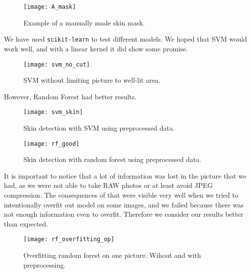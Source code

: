                 \begin{figure}[H]
                    \caption{Example of a manually made skin mask.}
                    \centering
                    \texttt{[image: A\_mask]}
                    \label{fig:A_mask}
                \end{figure}

                We have used \texttt{scikit-learn} to test different models.
                We hoped that SVM would work well, and with a
                linear kernel it did show some promise.

                 \begin{figure}[H]
                    \caption{SVM without limiting picture to well-lit area.}
                    \centering
                    \texttt{[image: svm\_no\_cut]}
                    \label{fig:svm_no_cut}
                \end{figure}

                However, Random Forest had  better results.

                  \begin{figure}[H]
                    \caption{Skin detection with SVM using preprocessed data.}
                    \centering
                    \texttt{[image: svm\_skin]}
                    \label{fig:rf_good}
                \end{figure}
            

                \begin{figure}[H]
                    \caption{Skin detection with random forest using preprocessed data.}
                    \centering
                    \texttt{[image: rf\_good]}
                    \label{fig:rf_good}
                \end{figure}

                It is important to notice that a lot of information was lost in the
                picture that we had, as we were not able to take RAW photos or at least
                avoid JPEG compression.
                The consequences of that were visible very well when we tried to
                intentionally overfit out model on some images, and we failed
                because there was not enough information even to overfit.
                Therefore we consider our results better than expected.

                 \begin{figure}[H]
                    \caption{Overfitting random forest on one picture. Wihout and with preprocessing.}
                    \centering
                    \texttt{[image: rf\_overfitting\_op]}
                    \label{fig:rf_overfitting_op}
                \end{figure}

